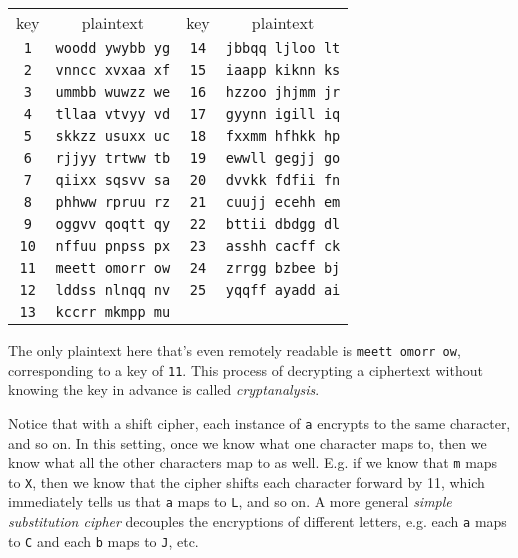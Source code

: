 \documentclass[12pt]{article}
\theoremstyle{plain}
\theoremstyle{definition}
\theoremstyle{remark}
\begin{document}
\begin{center}
    \begin{tabular}{|c|c||c|c|}
    \hline
    key & plaintext & key & plaintext\\
    \texttt{1} & \texttt{woodd ywybb yg} & \texttt{14} & \texttt{jbbqq ljloo lt}\\
    \texttt{2} & \texttt{vnncc xvxaa xf} & \texttt{15} & \texttt{iaapp kiknn ks}\\
    \texttt{3} & \texttt{ummbb wuwzz we} & \texttt{16} & \texttt{hzzoo jhjmm jr}\\
    \texttt{4} & \texttt{tllaa vtvyy vd} & \texttt{17} & \texttt{gyynn igill iq}\\
    \texttt{5} & \texttt{skkzz usuxx uc} & \texttt{18} & \texttt{fxxmm hfhkk hp}\\
    \texttt{6} & \texttt{rjjyy trtww tb} & \texttt{19} & \texttt{ewwll gegjj go}\\
    \texttt{7} & \texttt{qiixx sqsvv sa} & \texttt{20} & \texttt{dvvkk fdfii fn}\\
    \texttt{8} & \texttt{phhww rpruu rz} & \texttt{21} & \texttt{cuujj ecehh em}\\
    \texttt{9} & \texttt{oggvv qoqtt qy} & \texttt{22} & \texttt{bttii dbdgg dl}\\
    \texttt{10} & \texttt{nffuu pnpss px} & \texttt{23} & \texttt{asshh cacff ck}\\
    \texttt{11} & \texttt{meett omorr ow} & \texttt{24} & \texttt{zrrgg bzbee bj}\\
    \texttt{12} & \texttt{lddss nlnqq nv} & \texttt{25} & \texttt{yqqff ayadd ai}\\
    \texttt{13} & \texttt{kccrr mkmpp mu} & \texttt{ } & \texttt{ }\\
    \hline
    \end{tabular}
\end{center}

The only plaintext here that's even remotely readable is \texttt{meett omorr ow}, corresponding to a key of \texttt{11}.
This process of decrypting a ciphertext without knowing the key in advance is called \emph{cryptanalysis}.

Notice that with a shift cipher, each instance of \texttt{a} encrypts to the same character, and so on.
In this setting, once we know what one character maps to, then we know what all the other characters map to as well.
E.g. if we know that \texttt{m} maps to \texttt{X}, then we know that the cipher shifts each character forward by 11, which immediately tells us that \texttt{a} maps to \texttt{L}, and so on.
A more general \emph{simple substitution cipher} decouples the encryptions of different letters, e.g. each \texttt{a} maps to \texttt{C} and each \texttt{b} maps to \texttt{J}, etc.
\end{document}
